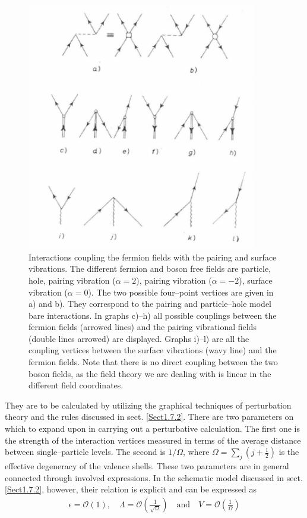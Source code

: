      \begin{figure}
     \centerline {
     \includegraphics*[width=10cm]{introduccion/figs/fig23}
     }
     \caption{Interactions coupling the fermion fields with the pairing and surface vibrations. The different fermion and boson free fields are particle, hole, pairing vibration ($\alpha=2$), pairing vibration ($\alpha=-2$), surface vibration ($\alpha=0$). The two possible four--point vertices are given in a) and b). They correspond to the pairing and particle--hole model bare interactions. In graphs c)--h) all possible couplings between the fermion fields (arrowed lines) and the pairing vibrational fields (double lines arrowed) are displayed. Graphs i)--l) are all the coupling vertices between the surface vibrations (wavy line) and the fermion fields. Note that there is no direct coupling between the two boson fields, as the field theory we are dealing with is linear in the different field coordinates.}
     \label{figC1A6}
     \end{figure}

They are to be calculated by utilizing the graphical techniques of perturbation theory and the rules discussed in sect. \ref{Sect1.7.2}. 
There are two parameters on which to expand upon in carrying out a perturbative  calculation. The first one is the strength of the interaction vertices measured in terms of the average distance between single--particle levels. The second is $1/\Omega$, where $\Omega=\sum_j(j+\frac{1}{2})$ is the effective degeneracy of the valence shells. These two parameters are in general connected through involved expressions. In the schematic model discussed in sect. \ref{Sect1.7.2}, however, their relation is explicit and can be expressed as 
  \begin{align}\label{eqC1A86} 
   \epsilon=\mathcal O(1),\quad \Lambda=\mathcal O\left(\frac{1}{\sqrt{\Omega}}\right)\quad \text{and}\quad V=\mathcal O\left(\frac{1}{\Omega}\right)
    \end{align}   

